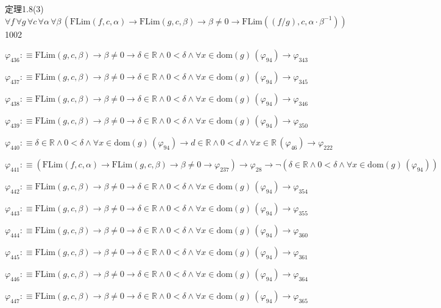 \begin{fullproof}{定理1.8(3)}{$\forall f\,\forall g\,\forall c\,\forall \alpha\,\forall \beta\,(\mathrm{FLim}(f,c,\alpha) \to \mathrm{FLim}(g,c,\beta) \to \beta \neq 0 \to \mathrm{FLim}((f / g),c,\alpha \cdot \beta^{-1}))$}{1002}
\begin{abbrevlist}
\item $\varphi_{436} :\equiv \mathrm{FLim}(g,c,\beta) \to \beta \neq 0 \to \delta \in \mathbb{R} \land 0 < \delta \land \forall x \in \mathrm{dom}(g)\,(\varphi_{94}) \to \varphi_{343}$
\item $\varphi_{437} :\equiv \mathrm{FLim}(g,c,\beta) \to \beta \neq 0 \to \delta \in \mathbb{R} \land 0 < \delta \land \forall x \in \mathrm{dom}(g)\,(\varphi_{94}) \to \varphi_{345}$
\item $\varphi_{438} :\equiv \mathrm{FLim}(g,c,\beta) \to \beta \neq 0 \to \delta \in \mathbb{R} \land 0 < \delta \land \forall x \in \mathrm{dom}(g)\,(\varphi_{94}) \to \varphi_{346}$
\item $\varphi_{439} :\equiv \mathrm{FLim}(g,c,\beta) \to \beta \neq 0 \to \delta \in \mathbb{R} \land 0 < \delta \land \forall x \in \mathrm{dom}(g)\,(\varphi_{94}) \to \varphi_{350}$
\item $\varphi_{440} :\equiv \delta \in \mathbb{R} \land 0 < \delta \land \forall x \in \mathrm{dom}(g)\,(\varphi_{94}) \to d \in \mathbb{R} \land 0 < d \land \forall x \in \mathbb{R}\,(\varphi_{46}) \to \varphi_{222}$
\item $\varphi_{441} :\equiv (\mathrm{FLim}(f,c,\alpha) \to \mathrm{FLim}(g,c,\beta) \to \beta \neq 0 \to \varphi_{237}) \to \varphi_{28} \to \neg (\delta \in \mathbb{R} \land 0 < \delta \land \forall x \in \mathrm{dom}(g)\,(\varphi_{94}))$
\item $\varphi_{442} :\equiv \mathrm{FLim}(g,c,\beta) \to \beta \neq 0 \to \delta \in \mathbb{R} \land 0 < \delta \land \forall x \in \mathrm{dom}(g)\,(\varphi_{94}) \to \varphi_{354}$
\item $\varphi_{443} :\equiv \mathrm{FLim}(g,c,\beta) \to \beta \neq 0 \to \delta \in \mathbb{R} \land 0 < \delta \land \forall x \in \mathrm{dom}(g)\,(\varphi_{94}) \to \varphi_{355}$
\item $\varphi_{444} :\equiv \mathrm{FLim}(g,c,\beta) \to \beta \neq 0 \to \delta \in \mathbb{R} \land 0 < \delta \land \forall x \in \mathrm{dom}(g)\,(\varphi_{94}) \to \varphi_{360}$
\item $\varphi_{445} :\equiv \mathrm{FLim}(g,c,\beta) \to \beta \neq 0 \to \delta \in \mathbb{R} \land 0 < \delta \land \forall x \in \mathrm{dom}(g)\,(\varphi_{94}) \to \varphi_{361}$
\item $\varphi_{446} :\equiv \mathrm{FLim}(g,c,\beta) \to \beta \neq 0 \to \delta \in \mathbb{R} \land 0 < \delta \land \forall x \in \mathrm{dom}(g)\,(\varphi_{94}) \to \varphi_{364}$
\item $\varphi_{447} :\equiv \mathrm{FLim}(g,c,\beta) \to \beta \neq 0 \to \delta \in \mathbb{R} \land 0 < \delta \land \forall x \in \mathrm{dom}(g)\,(\varphi_{94}) \to \varphi_{365}$

\end{abbrevlist}
\end{fullproof}
